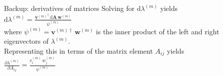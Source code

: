 \documentclass{beamer}
\begin{document}
\begin{frame}{Backup: derivatives of matrices}
  Solving for $\mathrm{d}\lambda^{(m)}$ yields\\
  \vspace{.5cm}
  $\mathrm{d}\lambda^{(m)} = \frac{{\mathbf{v}^{(m)}}^{\dagger} \, \mathrm{d}\mathbf{A} \, \mathbf{w}^{(m)}}{\psi^{(m)}}$\\
  \vspace{.5cm}
  where $\psi^{(m)}=\mathbf{v}^{(m)\dagger} \, \mathbf{w}^{(m)}$ is the inner product of the left and right eigenvectors of $\lambda^{(m)}$.\\
  \vspace{.5cm}
  Representing this in terms of the matrix element $A_{ij}$ yields\\
  \vspace{.5cm}
  $\frac{\partial \lambda^{(m)}}{\partial A_{ij}} = \frac{v^{(m)}_i \, w^{(m)}_j}{\psi^{(m)}}$
\end{frame}
\end{document}
